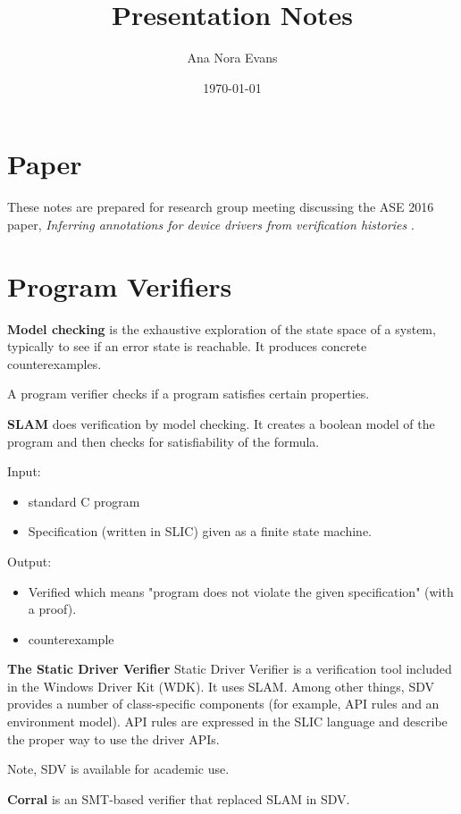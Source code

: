 \documentclass[12pt]{article}
\begin{document}
\title{Presentation Notes}
\author{Ana Nora Evans}
\date{\today}
\maketitle
\thispagestyle{empty}

\section{Paper}
These notes are prepared for research group meeting discussing the ASE 2016 paper, \textit{Inferring annotations for device drivers from verification histories} \cite{paper}. 

\section{Program Verifiers}

\textbf{Model checking} is the exhaustive exploration of the state space of a system, typically to see if an error state is reachable. It produces concrete counterexamples.

A program verifier checks if a program satisfies certain properties.

\textbf{SLAM} does verification by model checking. It creates a boolean model of the program and then checks for satisfiability of the formula.

Input: 
\begin{itemize}
\item standard C program 
\item Specification (written in SLIC) given as a finite state machine.
\end{itemize}
Output:
\begin{itemize}
\item Verified which means "program does not violate the given specification" (with a proof).
\item counterexample 
\end{itemize}

\textbf{The Static Driver Verifier}
Static Driver Verifier \cite{SDV} is a verification tool included in the Windows Driver Kit (WDK). It uses SLAM. Among other things, SDV provides a number of class-specific components (for example, API rules and an environment model). API rules are expressed in the SLIC language and describe the proper way to use the driver APIs.

Note, SDV is available for academic use.

\textbf{Corral} \cite{Corral} is an SMT-based verifier that replaced SLAM in SDV.
\end{document}
